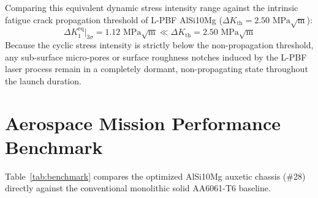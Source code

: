 \documentclass[preprint,12pt,3p]{elsarticle}
\begin{document}
Comparing this equivalent dynamic stress intensity range against the intrinsic fatigue crack propagation threshold of L-PBF AlSi10Mg ($\Delta K_{\text{th}} = 2.50\text{ MPa}\sqrt{\text{m}}$):
\begin{equation}
  \Delta K_1^{\text{eq}}\big|_{3\sigma} = 1.12\text{ MPa}\sqrt{\text{m}} \ll \Delta K_{\text{th}} = 2.50\text{ MPa}\sqrt{\text{m}}
\end{equation}
Because the cyclic stress intensity is strictly below the non-propagation threshold, any sub-surface micro-pores or surface roughness notches induced by the L-PBF laser process remain in a completely dormant, non-propagating state throughout the launch duration.

\section{Aerospace Mission Performance Benchmark}
\label{sec:benchmark}

Table~\ref{tab:benchmark} compares the optimized AlSi10Mg auxetic chassis (\#28) directly against the conventional monolithic solid AA6061-T6 baseline.
\end{document}
